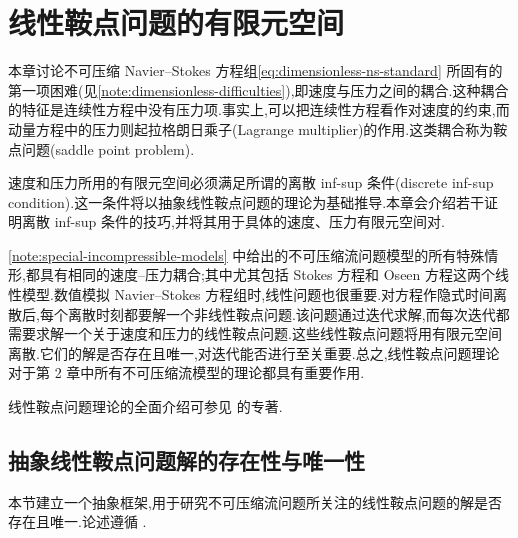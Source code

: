 \chapter{线性鞍点问题的有限元空间}\label{chap:finite-element-spaces}

\begin{note}[动机]\label{note:ch03-motivation}
本章讨论不可压缩 Navier--Stokes 方程组\cref{eq:dimensionless-ns-standard} 所固有的第一项困难(见\cref{note:dimensionless-difficulties}),即速度与压力之间的耦合.这种耦合的特征是连续性方程中没有压力项.事实上,可以把连续性方程看作对速度的约束,而动量方程中的压力则起拉格朗日乘子(Lagrange multiplier)的作用.这类耦合称为鞍点问题(saddle point problem).

速度和压力所用的有限元空间必须满足所谓的离散 inf-sup 条件(discrete inf-sup condition).这一条件将以抽象线性鞍点问题的理论为基础推导.本章会介绍若干证明离散 inf-sup 条件的技巧,并将其用于具体的速度、压力有限元空间对.

\cref{note:special-incompressible-models} 中给出的不可压缩流问题模型的所有特殊情形,都具有相同的速度--压力耦合;其中尤其包括 Stokes 方程和 Oseen 方程这两个线性模型.数值模拟 Navier--Stokes 方程组时,线性问题也很重要.对方程作隐式时间离散后,每个离散时刻都要解一个非线性鞍点问题.该问题通过迭代求解,而每次迭代都需要求解一个关于速度和压力的线性鞍点问题.这些线性鞍点问题将用有限元空间离散.它们的解是否存在且唯一,对迭代能否进行至关重要.总之,线性鞍点问题理论对于第 2 章中所有不可压缩流模型的理论都具有重要作用.

线性鞍点问题理论的全面介绍可参见 \textcite{Boffi2013} 的专著.
\end{note}

\section{抽象线性鞍点问题解的存在性与唯一性}\label{sec:abstract-saddle-point}

\begin{note}[本节内容]\label{note:abstract-saddle-point-contents}
本节建立一个抽象框架,用于研究不可压缩流问题所关注的线性鞍点问题的解是否存在且唯一.论述遵循 \textcite[第 I 章第 4 节]{GiraultRaviart1986}.
\end{note}


